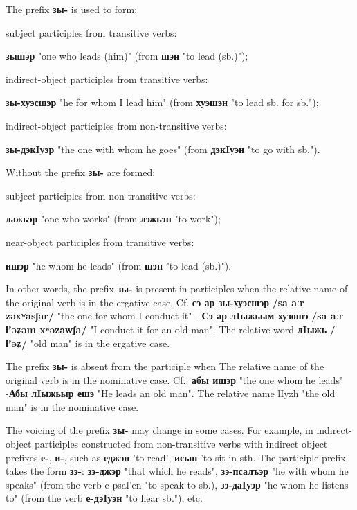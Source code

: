\documentclass[a4paper,12pt]{book}
\newcommand{\1}[1]{\textbf{\emph{#1}}} %
\newcommand{\2}[1]{\textbf{[#1]}} %
\newcommand{\3}[1]{\fontsize{11pt}{0cm}\textbf{\emph{#1}}} %
\newcommand{\4}[1]{\fontsize{10pt}{0cm}\emph{#1}}	%
\newcommand{\5}[1]{\textbf{/#1/}} %
\newcommand{\6}[1]{\textbf{[#1]}} %
\newcommand{\7}[1]{\fontsize{12pt}{0cm}\emph{#1}} %
\newcommand{\8}[1]{\fontsize{12pt}{0cm}`#1'} %
\newcommand{\9}[1]{\fontsize{12pt}{0cm}(lit. `#1')} %
\newcommand{\glossphonemics}[1]{\textbf{/#1/}} %
\begin{document}
The prefix \textbf{зы-} is used to form:
\begin{xlist}
\ex  subject participles from transitive verbs: 
	\begin{xlist}
	\ex \textbf{зышэр} "one who leads (him)" (from \textbf{шэн} "to lead (sb.)");
	\end{xlist}

\ex  indirect-object participles from transitive verbs: 
	\begin{xlist}
	\ex \textbf{зы-хуэсшэр} "he for whom I lead him" (from \textbf{хуэшэн} "to lead sb. for sb.");
	\end{xlist}

\ex indirect-object participles from non-transitive verbs: 
	\begin{xlist}
	\ex \textbf{зы-дэкIуэр} "the one with whom he goes" (from \textbf{дэкIуэн} "to go with sb.").
	\end{xlist}
\end{xlist}

Without the prefix \textbf{зы-} are formed:
\begin{xlist}
\ex subject participles from non-transitive verbs: 
	\begin{xlist}
	\ex \textbf{лажьэр} "one who works" (from \textbf{лэжьэн} "to work");
	\end{xlist}

\ex near-object participles from transitive verbs: 
	\begin{xlist}
	\ex \textbf{ишэр} "he whom he leads" (from \textbf{шэн} "to lead (sb.)").
	\end{xlist}
\end{xlist}
In other words, the prefix \textbf{зы-} is present in participles when the relative name of the original verb is in the ergative case. Cf. \textbf{сэ ар зы-хуэсшэр} \glossphonemics{sa aːr zəxʷasʃar} "the one for whom I conduct it" - \textbf{Сэ ар лIыжьым хузошэ} \glossphonemics{sa aːr ɬʼəʑəm xʷəzawʃa} "I conduct it for an old man". The relative word \textbf{лIыжь} \glossphonemics{ɬʼəʑ} "old man" is in the ergative case.

The prefix \textbf{зы-} is absent from the participle when The relative name of the original verb is in the nominative case. Cf.: \textbf{абы ишэр} "the one whom he leads" -\textbf{Абы лIыжьыр ешэ} "He leads an old man". The relative name lIyzh "the old man" is in the nominative case.

The voicing of the prefix \textbf{зы-} may change in some cases. For example, in indirect-object participles constructed from non-transitive verbs with indirect object prefixes \textbf{е-}, \textbf{и-}, such as \textbf{еджэн} 'to read', \textbf{исын} 'to sit in sth. The participle prefix takes the form \textbf{зэ-}: \textbf{зэ-джэр} "that which he reads", \textbf{зэ-псалъэр} "he with whom he speaks" (from the verb e-psal'en "to speak to sb.), \textbf{зэ-даIуэр} "he whom he listens to" (from the verb \textbf{е-дэIуэн} "to hear sb."), etc.
\end{document}
